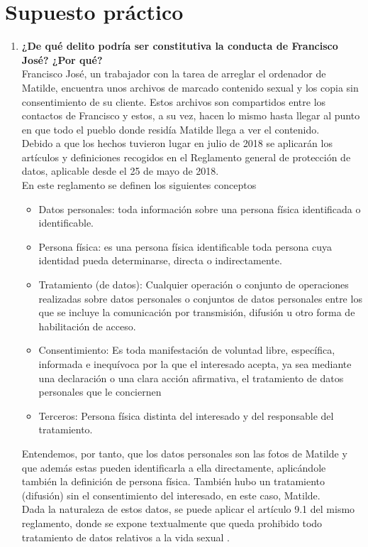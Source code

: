\documentclass[10pt,a4paper]{article}
\begin{document}
\section{Supuesto práctico}
\begin{enumerate}
\item \textbf{¿De qué delito podría ser constitutiva la conducta de Francisco José? ¿Por qué?}\\
Francisco José, un trabajador con la tarea de arreglar el ordenador de Matilde, encuentra unos archivos de marcado contenido sexual y los copia sin consentimiento de su cliente. Estos archivos son compartidos entre los contactos de Francisco y estos, a su vez, hacen lo mismo hasta llegar al punto en que todo el pueblo donde residía Matilde llega a ver el contenido.\\

Debido a que los hechos tuvieron lugar en julio de 2018 se aplicarán los artículos y definiciones recogidos en el Reglamento
general de protección de datos, aplicable desde el 25 de mayo de 2018.\\
En este reglamento se definen los siguientes conceptos \cite[Art. 4]{dirregp}
\begin{itemize}
\item Datos personales: toda información sobre una persona física identificada o identificable.
\item Persona física: es una persona física identificable toda persona cuya identidad pueda determinarse, directa o indirectamente.
\item Tratamiento (de datos): Cualquier operación o conjunto de operaciones realizadas sobre datos personales o conjuntos de
datos personales entre los que se incluye la comunicación por transmisión, difusión u otro forma de habilitación de acceso.
\item Consentimiento: Es toda manifestación de voluntad libre, específica, informada e inequívoca por la que el interesado acepta, ya sea mediante una declaración o una clara acción afirmativa, el tratamiento de datos personales que le conciernen
\item Terceros: Persona física distinta del interesado y del responsable
del tratamiento.
\end{itemize}
Entendemos, por tanto, que los datos personales son las fotos de Matilde y que además estas pueden identificarla a ella directamente, aplicándole también la definición de persona física. También hubo un tratamiento (difusión) sin el consentimiento del interesado, en este caso, Matilde.\\
Dada la naturaleza de estos datos, se puede aplicar el artículo 9.1 del mismo reglamento, donde se expone textualmente que queda prohibido todo tratamiento de datos relativos a la vida sexual \cite[Art. 9.1]{dirregp}.\\


\end{enumerate}
\end{document}
